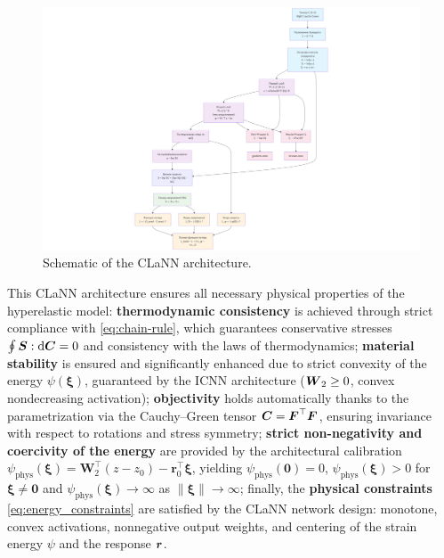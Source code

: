 \begin{figure}[H]
  \centering
  \includegraphics[width=\textwidth]{../img/clann_arc.png}
  \caption{Schematic of the CLaNN architecture.}
  \label{fig:clann_arc}
  \label{fig:clann_icnn1_nn}
\end{figure}


This CLaNN architecture ensures all necessary physical properties of the hyperelastic model: 
\textbf{thermodynamic consistency} is achieved through strict compliance with \eqref{eq:chain-rule}, 
which guarantees conservative stresses $\oint \boldsymbol{S}:\mathrm{d}\boldsymbol{C} = 0$ and consistency with the laws of 
thermodynamics; 
\textbf{material stability} is ensured and significantly enhanced due to strict convexity of the energy 
$\psi(\boldsymbol{\xi})$, guaranteed by the ICNN architecture ($\boldsymbol{W}_2 \ge 0$, convex nondecreasing activation); 
\textbf{objectivity} holds automatically thanks to the parametrization via the 
Cauchy--Green tensor $\boldsymbol{C} = \boldsymbol{F}^{\top}\boldsymbol{F}$, ensuring invariance with respect to rotations and stress symmetry; 
\textbf{strict non-negativity and coercivity of the energy} are provided by the architectural calibration 
$\psi_{\mathrm{phys}}(\boldsymbol{\xi}) = \mathbf{W}_2^{\top}(z - z_0) - \mathbf{r}_0^{\top}\boldsymbol{\xi}$,
yielding $\psi_{\mathrm{phys}}(\mathbf{0})=0$, $\psi_{\mathrm{phys}}(\boldsymbol{\xi})>0$ for $\boldsymbol{\xi}\ne\mathbf{0}$ and 
$\psi_{\mathrm{phys}}(\boldsymbol{\xi})\to\infty$ as $\|\boldsymbol{\xi}\|\to\infty$; 
finally, the \textbf{physical constraints} \eqref{eq:energy_constraints} are satisfied by the CLaNN network design: monotone, convex activations,
nonnegative output weights, and centering of the strain energy $\psi$ and the response $\boldsymbol{r}$.


